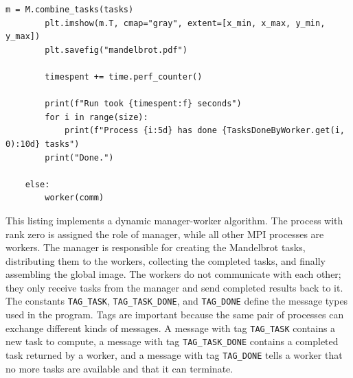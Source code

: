 \documentclass[unicode,10pt,a4paper,oneside,numbers=endperiod,openany]{scrartcl}
\begin{document}
\begin{lstlisting}[style=grayverbatim,label={lst:mandelbrot_manager_worker},caption={Manager-worker pattern for computing the Mandelbrot set in parallel}]
        m = M.combine_tasks(tasks)
        plt.imshow(m.T, cmap="gray", extent=[x_min, x_max, y_min, y_max])
        plt.savefig("mandelbrot.pdf")

        timespent += time.perf_counter()

        print(f"Run took {timespent:f} seconds")
        for i in range(size):
            print(f"Process {i:5d} has done {TasksDoneByWorker.get(i, 0):10d} tasks")
        print("Done.")

    else:
        worker(comm)
\end{lstlisting}
This listing implements a dynamic manager-worker algorithm. The process with rank zero is assigned
the role of manager, while all other MPI processes are workers. The manager is responsible for creating
the Mandelbrot tasks, distributing them to the workers, collecting the completed tasks, and finally
assembling the global image. The workers do not communicate with each other; they only receive tasks
from the manager and send completed results back to it.\\

The constants \texttt{TAG\_TASK}, \texttt{TAG\_TASK\_DONE}, and \texttt{TAG\_DONE} define the message
types used in the program. Tags are important because the same pair of processes can exchange
different kinds of messages. A message with tag \texttt{TAG\_TASK} contains a new task to compute,
a message with tag \texttt{TAG\_TASK\_DONE} contains a completed task returned by a worker, and a
message with tag \texttt{TAG\_DONE} tells a worker that no more tasks are available and that it can
terminate.\\
\end{document}
